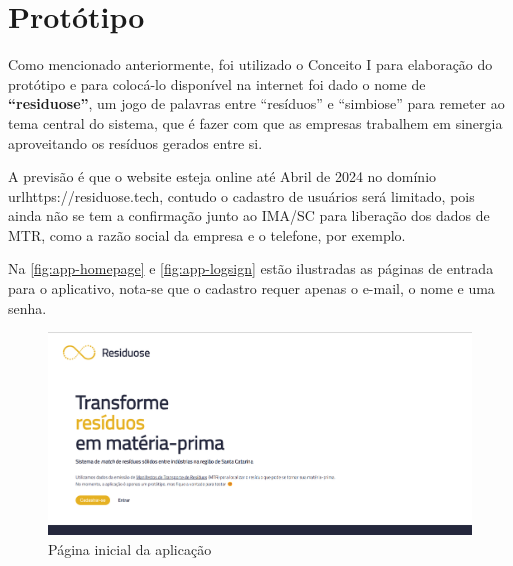 \section{Protótipo}

Como mencionado anteriormente, foi utilizado o Conceito I para elaboração do protótipo e para colocá-lo disponível na internet foi dado o nome de \textbf{“residuose”}, um jogo de palavras entre “resíduos” e “simbiose” para remeter ao tema central do sistema, que é fazer com que as empresas trabalhem em sinergia aproveitando os resíduos gerados entre si.

A previsão é que o website esteja online até Abril de 2024 no domínio url{https://residuose.tech}, contudo o cadastro de usuários será limitado, pois ainda não se tem a confirmação junto ao \gls{IMA/SC} para liberação dos dados de \gls{MTR}, como a razão social da empresa e o telefone, por exemplo. 

Na \autoref{fig:app-homepage} e \autoref{fig:app-logsign} estão ilustradas as páginas de entrada para o aplicativo, nota-se que o cadastro requer apenas o e-mail, o nome e uma senha.

\begin{figure}[H]
	\caption{\label{fig:app-homepage} Página inicial da aplicação}
	\begin{center}
		\includegraphics[scale=0.38]{images/homepage.png}
	\end{center}
\end{figure}

